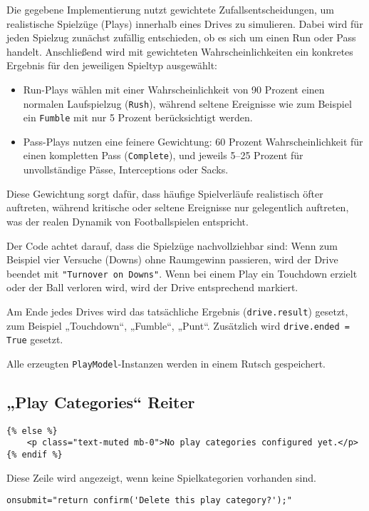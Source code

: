 Die gegebene Implementierung nutzt gewichtete Zufallsentscheidungen, um realistische Spielzüge (Plays) innerhalb eines Drives zu simulieren. Dabei wird für jeden Spielzug zunächst zufällig entschieden, ob es sich um einen Run oder Pass handelt. Anschließend wird mit gewichteten Wahrscheinlichkeiten ein konkretes Ergebnis für den jeweiligen Spieltyp ausgewählt:
\begin{itemize}
  \item Run-Plays wählen mit einer Wahrscheinlichkeit von 90 Prozent einen normalen Laufspielzug (\texttt{Rush}), während seltene Ereignisse wie zum Beispiel ein \texttt{Fumble} mit nur 5 Prozent berücksichtigt werden.
  \item Pass-Plays nutzen eine feinere Gewichtung: 60 Prozent Wahrscheinlichkeit für einen kompletten Pass (\texttt{Complete}), und jeweils 5–25 Prozent für unvollständige Pässe, Interceptions oder Sacks.
\end{itemize}

Diese Gewichtung sorgt dafür, dass häufige Spielverläufe realistisch öfter auftreten, während kritische oder seltene Ereignisse nur gelegentlich auftreten, was der realen Dynamik von Footballspielen entspricht.

Der Code achtet darauf, dass die Spielzüge nachvollziehbar sind: Wenn zum Beispiel vier Versuche (Downs) ohne Raumgewinn passieren, wird der Drive beendet mit \texttt{"Turnover on Downs"}. Wenn bei einem Play ein Touchdown erzielt oder der Ball verloren wird, wird der Drive entsprechend markiert.

Am Ende jedes Drives wird das tatsächliche Ergebnis (\texttt{drive.result}) gesetzt, zum Beispiel „Touchdown“, „Fumble“, „Punt“. Zusätzlich wird \texttt{drive.ended = True} gesetzt.

Alle erzeugten \texttt{PlayModel}-Instanzen werden in einem Rutsch gespeichert.

\subsection{„Play Categories“ Reiter}

\begin{verbatim}
{% else %}
    <p class="text-muted mb-0">No play categories configured yet.</p>
{% endif %}
\end{verbatim}

Diese Zeile wird angezeigt, wenn keine Spielkategorien vorhanden sind.

\begin{verbatim}
onsubmit="return confirm('Delete this play category?');"
\end{verbatim}

